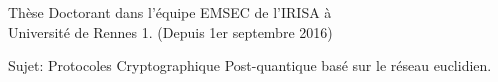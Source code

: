 \begin{frame}{Th\`ese}
  Doctorant dans l'\'equipe EMSEC de l'IRISA \`a \\Universit\'e de Rennes 1. (Depuis 1er septembre 2016)

  Sujet: Protocoles Cryptographique Post-quantique bas\'e sur le r\'eseau euclidien.
\end{frame}